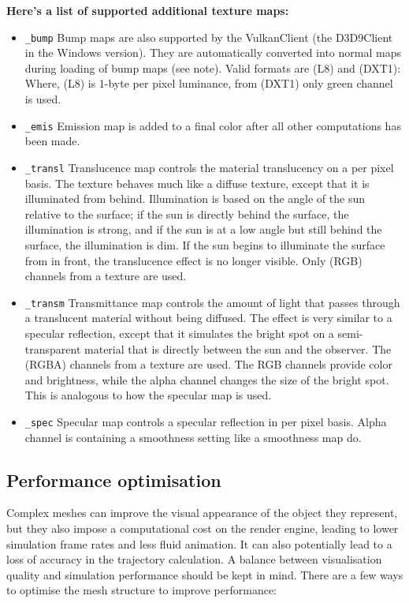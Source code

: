 \documentclass[Orbiter Developer Manual.tex]{subfiles}
\begin{document}
\textbf{Here's a list of supported additional texture maps:}
\begin{itemize}
\item	\texttt{\_bump} Bump maps are also supported by the VulkanClient (the D3D9Client in the Windows version). They are automatically converted into normal maps during loading of bump maps (see note). Valid formats are (L8) and (DXT1):  Where, (L8) is 1-byte per pixel luminance, from (DXT1) only green channel is used.
\item	\texttt{\_emis} Emission map is added to a final color after all other computations has been made. 
\item	\texttt{\_transl} Translucence map controls the material translucency on a per pixel basis. The texture behaves much like a diffuse texture, except that it is illuminated from behind. Illumination is based on the angle of the sun relative to the surface; if the sun is directly behind the surface, the illumination is strong, and if the sun is at a low angle but still behind the surface, the illumination is dim. If the sun begins to illuminate the surface from in front, the translucence effect is no longer visible. Only (RGB) channels from a texture are used. 
\item	\texttt{\_transm} Transmittance map controls the amount of light that passes through a translucent material without being diffused. The effect is very similar to a specular reflection, except that it simulates the bright spot on a semi-transparent material that is directly between the sun and the observer. The (RGBA) channels from a texture are used. The RGB channels provide color and brightness, while the alpha channel changes the size of the bright spot. This is analogous to how the specular map is used.
\item	\texttt{\_spec} Specular map controls a specular reflection in per pixel basis. Alpha channel is containing a smoothness setting like a smoothness map do.
\end{itemize}

\break
\subsection{Performance optimisation}
Complex meshes can improve the visual appearance of the object they represent, but they also impose a computational cost on the render engine, leading to lower simulation frame rates and less fluid animation. It can also potentially lead to a loss of accuracy in the trajectory calculation. A balance between visualisation quality and simulation performance should be kept in mind. There are a few ways to optimise the mesh structure to improve performance:
\end{document}

